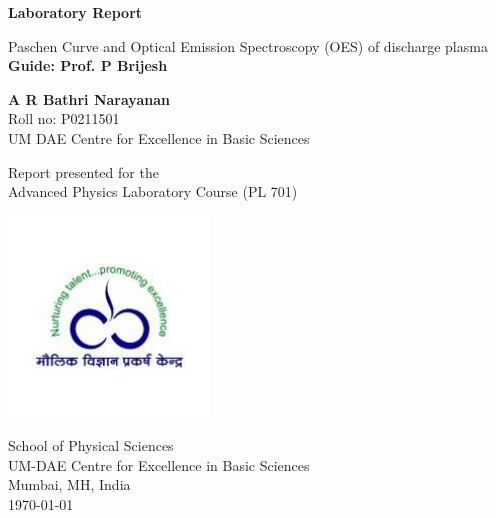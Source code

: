 \begin{titlepage}
	\begin{center}
		\vspace*{0.8cm}
		
		\Huge
		\textbf{Laboratory Report}
		
		\vspace{0.5cm}
		\LARGE
		Paschen Curve and Optical Emission Spectroscopy (OES) of discharge plasma\\
		\vspace{0.5cm}
		\textbf{Guide: Prof. P Brijesh}
		
		\vspace{1.5cm}
		
		\textbf{A R Bathri Narayanan}\\
		Roll no: P0211501\\
		UM DAE Centre for Excellence in Basic Sciences
		
		\vspace{3 cm}
		
		Report presented for the\\
		Advanced Physics Laboratory Course (PL 701)
		
		\vspace{0.8cm}
		
		\includegraphics[width=0.4\textwidth]{cebs.jpg}
		
		\Large
		School of Physical Sciences\\
		UM-DAE Centre for Excellence in Basic Sciences\\
		Mumbai, MH, India\\
		\today
		
	\end{center}
\end{titlepage}